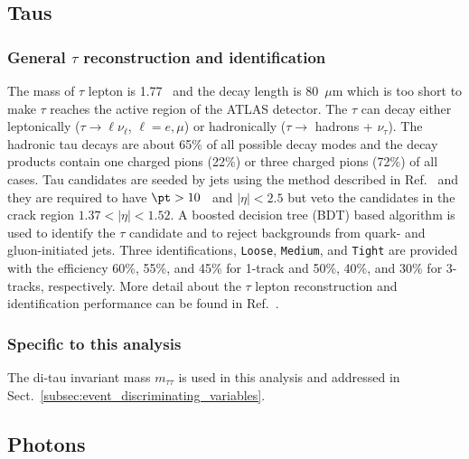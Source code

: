 
\subsection{Taus}
\label{subsec:event_Taus}


\subsubsection{General $\tau$ reconstruction and identification}
\label{subsubsec:event_taus_general}
The mass of $\tau$ lepton is 1.77~{\GeV} and the decay length is 80~$\mu$m which is too short to make $\tau$ reaches the active region of the ATLAS detector.
The $\tau$ can decay either leptonically ($\tau \to \ell \nu_{\ell}$, $\ell = e, \mu$) or hadronically ($\tau \to$ hadrons + $\nu_{\tau}$).
The hadronic tau decays are about 65\% of all possible decay modes and the decay products contain one charged pions (22\%) or three charged pions (72\%) of all cases.
Tau candidates are seeded by jets using the method described in Ref.~\cite{ATLAS:2017mpa} and they are required to have $\pt > 10$~{\GeV} and $|\eta| < 2.5$ but veto the candidates in the crack region $1.37 < |\eta| < 1.52$.
A boosted decision tree (BDT) based algorithm is used to identify the $\tau$ candidate and to reject backgrounds from quark- and gluon-initiated jets.
Three identifications, \texttt{Loose}, \texttt{Medium}, and \texttt{Tight} are provided with the efficiency 60\%, 55\%, and 45\% for 1-track and 50\%, 40\%, and 30\% for 3-tracks, respectively.
More detail about the $\tau$ lepton reconstruction and identification performance can be found in Ref.~\cite{ATLAS:2017mpa}.


\subsubsection{Specific to this analysis}
\label{subsubsec:event_taus_specific}
The di-tau invariant mass $m_{\tau\tau}$ is used in this analysis and addressed in Sect.~\ref{subsec:event_discriminating_variables}.


\subsection{Photons}
\label{subsec:event_photons}


